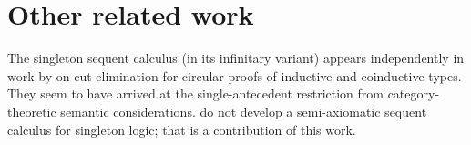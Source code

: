 


\section{Other related work}\label{sec:singleton-logic:related-work}

The singleton sequent calculus (in its infinitary variant) appears independently in work by \citeauthor{Fortier+Santocanale:CSL13} on cut elimination for circular proofs of inductive and coinductive types.\autocites{Santocanale:FOSSACS02}{Fortier+Santocanale:CSL13}
They seem to have arrived at the single-antecedent restriction from category-theoretic semantic considerations.
 do not develop a semi-axiomatic sequent calculus for singleton logic; that is a contribution of this work.


